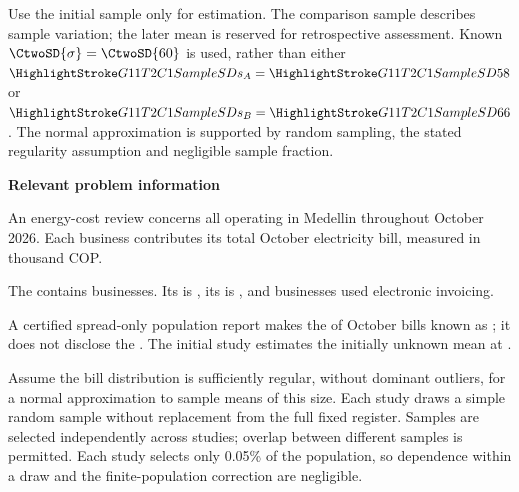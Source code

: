 Use the initial sample only for estimation. The comparison sample describes sample variation; the later mean is reserved for retrospective assessment. Known $\CtwoSD{\sigma}=\CtwoSD{60}$ is used, rather than either $\SSD{s_A}=\SSD{58}$ or $\SSD{s_B}=\SSD{66}$. The normal approximation is supported by random sampling, the stated regularity assumption and negligible sample fraction.

\secInicio[][sec:p1]

\clearpage



\textbf{Relevant problem information}

\begin{probleminfoexcerpt}
An energy-cost review concerns all     operating in Medellin throughout October 2026. Each business contributes its total October electricity bill, measured in thousand COP.
\end{probleminfoexcerpt}

\begin{probleminfoexcerpt}
The     contains  businesses. Its   is   , its    is   , and  businesses used electronic invoicing.
\end{probleminfoexcerpt}

\begin{probleminfoexcerpt}
A certified spread-only population report makes the    of October bills known as   ; it does not disclose the  . The initial study estimates the initially unknown mean at  .
\end{probleminfoexcerpt}

\begin{probleminfoexcerpt}
Assume the bill distribution is sufficiently regular, without dominant outliers, for a normal approximation to sample means of this size. Each study draws a simple random sample without replacement from the full fixed register. Samples are selected independently across studies; overlap between different samples is permitted. Each study selects only 0.05\% of the population, so dependence within a draw and the finite-population correction are negligible.
\end{probleminfoexcerpt}

